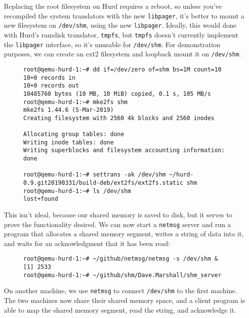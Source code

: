 \documentclass{article}
\def\libpager{{\tt libpager}\xspace}
\def\netmsg{{\tt netmsg}\xspace}
\begin{document}
Replacing the root filesystem on Hurd requires a reboot, so unless
you've recompiled the system translators with the new \libpager, it's
better to mount a new filesystem on {\tt /dev/shm}, using the new
\libpager.  Ideally, this would done with Hurd's ramdisk translator,
         {\tt tmpfs}, but {\tt tmpfs} doesn't currently implement
the \libpager interface, so it's unusable for {\tt /dev/shm}.
For demonstration purposes, we can create an ext2 filesystem
and loopback mount it on {\tt /dev/shm}.

\begin{figure}[h]
\begin{mdframed}
\begin{verbatim}
root@qemu-hurd-1:~# dd if=/dev/zero of=shm bs=1M count=10    
10+0 records in
10+0 records out
10485760 bytes (10 MB, 10 MiB) copied, 0.1 s, 105 MB/s
root@qemu-hurd-1:~# mke2fs shm
mke2fs 1.44.6 (5-Mar-2019)
Creating filesystem with 2560 4k blocks and 2560 inodes

Allocating group tables: done                            
Writing inode tables: done                            
Writing superblocks and filesystem accounting information: done

root@qemu-hurd-1:~# settrans -ak /dev/shm ~/hurd-0.9.git20190331/build-deb/ext2fs/ext2fs.static shm
root@qemu-hurd-1:~# ls /dev/shm
lost+found
\end{verbatim}
\end{mdframed}
\end{figure}

This isn't ideal, because our shared memory is saved to disk, but it
serves to prove the functionality desired.  We can now start a \netmsg
server and run a program that allocates a shared memory segment,
writes a string of data into it, and waits for an acknowledgment
that it has been read:

\begin{figure}[h]
\begin{mdframed}
\begin{verbatim}
root@qemu-hurd-1:~# ~/github/netmsg/netmsg -s /dev/shm &
[1] 2533
root@qemu-hurd-1:~# ~/github/shm/Dave.Marshall/shm_server 
\end{verbatim}
\end{mdframed}
\end{figure}

On another machine, we use \netmsg to connect {\tt /dev/shm} to the
first machine.  The two machines now share their shared memory space,
and a client program is able to map the shared memory segment, read
the string, and acknowledge it.
\end{document}
